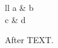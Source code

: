 \documentclass{article}
\begin{document}
\begin{tabular}{ll}
a & b\global\let\tnl\tabularnewline \\
\hline\noalign\tnl
c & d \\
\end{tabular}
After TEXT.
\end{document}
